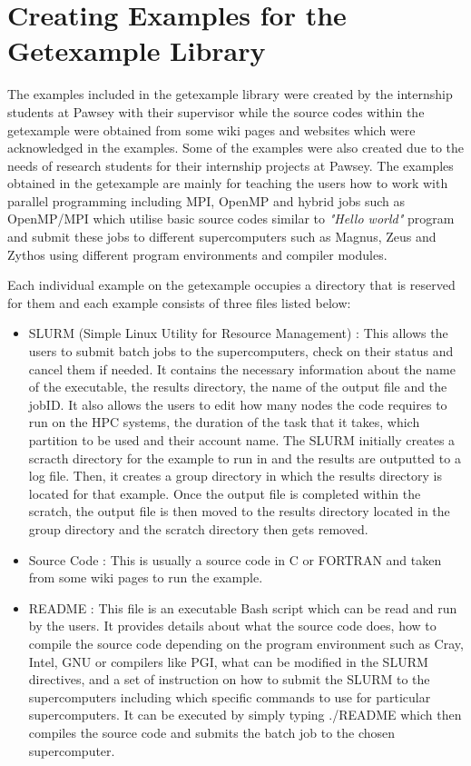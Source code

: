 \section{Creating Examples for the Getexample Library}

The examples included in the getexample library were created by the internship students at Pawsey with their supervisor while the source codes within the
getexample were obtained from some wiki pages and websites which were acknowledged in the examples. Some of the examples were also created due to the
needs of research students for their internship projects at Pawsey. The examples obtained in the getexample are mainly for teaching the users how to work
with parallel programming including MPI, OpenMP and hybrid jobs such as OpenMP/MPI which utilise basic source codes similar to \emph{"Hello world"} 
program and submit these jobs to different supercomputers such as Magnus, Zeus and Zythos using different program environments and compiler modules. 

Each individual example on the getexample occupies a directory that is reserved for them and each example consists of three files listed below:

\begin{itemize}    
\item SLURM (Simple Linux Utility for Resource Management) : This allows the users to submit batch jobs to the supercomputers, check on their status and 
cancel them if needed. It contains the necessary information about the name of the executable, the results directory, the name of the output file and 
the jobID. It also allows the users to edit how many nodes the code requires to run on the HPC systems, the duration of the task that it takes, which 
partition to be used and their account name. The SLURM initially creates a scracth directory for the example to run in and the results are outputted to 
a log file. Then, it creates a group directory in which the results directory is located for that example. Once the output file is completed within the 
scratch, the output file is then moved to the results directory located in the group directory and the scratch directory then gets removed.
\item Source Code : This is usually a source code in C or FORTRAN and taken from some wiki pages to run the example.
\item README : This file is an executable Bash script which can be read and run by the users. It provides details about what the source code does,
how to compile the source code depending on the program environment such as Cray, Intel, GNU or compilers like PGI, what can be modified in the SLURM 
directives, and a set of instruction on how to submit the SLURM to the supercomputers including which specific commands to use for particular 
supercomputers. It can be executed by simply typing ./README which then compiles the source code and submits the batch job to the chosen supercomputer.
\end{itemize}

